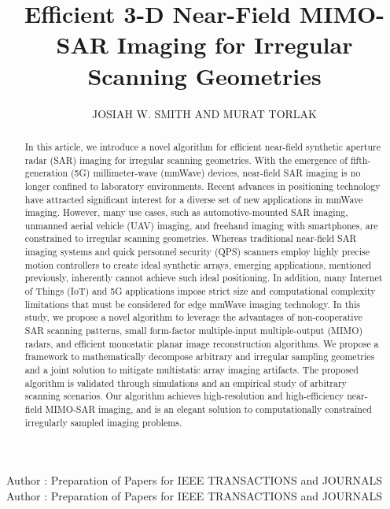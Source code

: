 \documentclass{ieeeaccess}
\begin{document}

\title{Efficient \mbox{3-D} Near-Field MIMO-SAR Imaging for Irregular Scanning Geometries}
\author{\uppercase{Josiah W. Smith and Murat Torlak}}

\address[1]{Electrical and Computer Engineering, The University of Texas at Dallas,
800 W. Campbell Rd. Richardson, TX 75080 USA (e-mail: jws160130@utdallas.edu)}


\markboth
{Author \headeretal: Preparation of Papers for IEEE TRANSACTIONS and JOURNALS}
{Author \headeretal: Preparation of Papers for IEEE TRANSACTIONS and JOURNALS}


\begin{abstract}
In this article, we introduce a novel algorithm for efficient near-field synthetic aperture radar (SAR) imaging for irregular scanning geometries. 
With the emergence of fifth-generation (5G) millimeter-wave (mmWave) devices, near-field SAR imaging is no longer confined to laboratory environments. 
Recent advances in positioning technology have attracted significant interest for a diverse set of new applications in mmWave imaging. 
However, many use cases, such as automotive-mounted SAR imaging, unmanned aerial vehicle (UAV) imaging, and freehand imaging with smartphones, are constrained to irregular scanning geometries. 
Whereas traditional near-field SAR imaging systems and quick personnel security (QPS) scanners employ highly precise motion controllers to create ideal synthetic arrays, emerging applications, mentioned previously, inherently cannot achieve such ideal positioning. 
In addition, many Internet of Things (IoT) and 5G applications impose strict size and computational complexity limitations that must be considered for edge mmWave imaging technology. 
In this study, we propose a novel algorithm to leverage the advantages of non-cooperative SAR scanning patterns, small form-factor multiple-input multiple-output (MIMO) radars, and efficient monostatic planar image reconstruction algorithms. 
We propose a framework to mathematically decompose arbitrary and irregular sampling geometries and a joint solution to mitigate multistatic array imaging artifacts. 
The proposed algorithm is validated through simulations and an empirical study of arbitrary scanning scenarios. 
Our algorithm achieves high-resolution and high-efficiency near-field MIMO-SAR imaging, and is an elegant solution to computationally constrained irregularly sampled imaging problems. 
\end{abstract}
\end{document}
